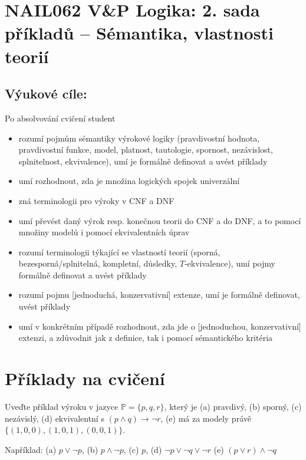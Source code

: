 \section*{NAIL062 V\&P Logika: 2. sada příkladů -- Sémantika, vlastnosti teorií}

\subsection*{Výukové cíle:} Po absolvování cvičení student

    \begin{itemize}\setlength{\itemsep}{0pt}
        \item rozumí pojmům sémantiky výrokové logiky (pravdivostní hodnota, pravdivostní funkce, model, platnost, tautologie, spornost, nezávislost, splnitelnost, ekvivalence), umí je formálně definovat a uvést příklady
        \item umí rozhodnout, zda je množina logických spojek univerzální
        \item zná terminologii pro výroky v CNF a DNF %
        \item umí převést daný výrok resp. konečnou teorii do CNF a do DNF, a to pomocí množiny modelů i pomocí ekvivalentních úprav
        \item rozumí terminologii týkající se vlastností teorií (sporná, bezesporná/splnitelná, kompletní, důsledky, $T$-ekvivalence), umí pojmy formálně definovat a uvést příklady
        \item rozumí pojmu [jednoduchá, konzervativní] extenze, umí je formálně definovat, uvést příklady
        \item umí v konkrétním případě rozhodnout, zda jde o [jednoduchou, konzervativní] extenzi, a zdůvodnit jak z definice, tak i pomocí sémantického kritéria
    \end{itemize}


\section*{Příklady na cvičení}


\begin{problem}

    Uveďte příklad výroku v jazyce $\mathbb P=\{p,q,r\}$, který je (a) pravdivý, (b) sporný, (c) nezávislý, (d) ekvivalentní s $(p\wedge q)\to\neg r$, (e) má za modely právě $\{(1,0,0),(1,0,1),(0,0,1)\}$.


    \begin{solution}
        Například: (a) $p\lor\neg p$, (b) $p\land\neg p$, (c) $p$, (d) $\neg p\lor\neg q\lor\neg r$ (e) $(p\lor r)\land\neg q$            
    \end{solution}

\end{problem}


